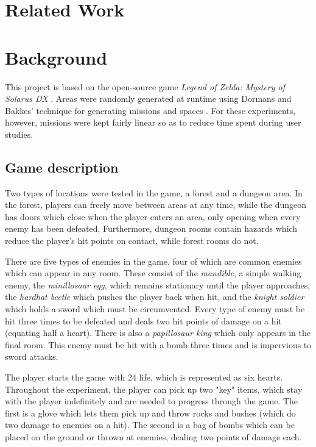 \documentclass[a4paper]{article}
\begin{document}
\begin{multicols*}{2}
\section{Related Work}

\section{Background}
This project is based on the open-source game \emph{Legend of Zelda: Mystery of Solarus DX} \cite{zeldasolarus}. Areas were randomly generated at runtime using Dormans and Bakkes' technique for generating missions and spaces \cite{missiongrammar}. For these experiments, however, missions were kept fairly linear so as to reduce time spent during user studies. 

\subsection{Game description}
Two types of locations were tested in the game, a forest and a dungeon area. In the forest, players can freely move between areas at any time, while the dungeon has doors which close when the player enters an area, only opening when every enemy has been defeated. Furthermore, dungeon rooms contain hazards which reduce the player's hit points on contact, while forest rooms do not.

There are five types of enemies in the game, four of which are common enemies which can appear in any room. These consist of the \emph{mandible}, a simple walking enemy, the \emph{minillosaur egg}, which remains stationary until the player approaches, the \emph{hardhat beetle} which pushes the player back when hit, and the \emph{knight soldier} which holds a sword which must be circumvented. Every type of enemy must be hit three times to be defeated and deals two hit points of damage on a hit (equating half a heart). There is also a \emph{papillosaur king} which only appears in the final room. This enemy must be hit with a bomb three times and is impervious to sword attacks.

The player starts the game with 24 life, which is represented as six hearts. Throughout the experiment, the player can pick up two "key" items, which stay with the player indefinitely and are needed to progress through the game. The first is a glove which lets them pick up and throw rocks and bushes (which do two damage to enemies on a hit). The second is a bag of bombs which can be placed on the ground or thrown at enemies, dealing two points of damage each. 


\end{multicols*}
\end{document}
